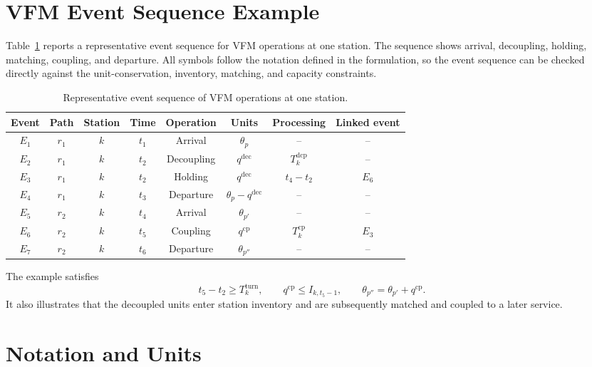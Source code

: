 \documentclass[11pt]{article}
\begin{document}
\section{VFM Event Sequence Example}
\label{App:VFMExample}

Table~\ref{AppTab:vfmEvent} reports a representative event sequence for VFM operations at one station. The sequence shows arrival, decoupling, holding, matching, coupling, and departure. All symbols follow the notation defined in the formulation, so the event sequence can be checked directly against the unit-conservation, inventory, matching, and capacity constraints.

\begin{table}[!htbp]
\centering
\small
\caption{Representative event sequence of VFM operations at one station.}
\label{AppTab:vfmEvent}
\begin{tabular}{cccccccc}
\toprule
\textbf{Event} & \textbf{Path} & \textbf{Station} & \textbf{Time} & \textbf{Operation} & \textbf{Units} & \textbf{Processing} & \textbf{Linked event} \\
\midrule
$E_1$ & $r_1$ & $k$ & $t_1$ & Arrival & $\theta_p$ & -- & -- \\
$E_2$ & $r_1$ & $k$ & $t_2$ & Decoupling & $q^{\mathrm{dec}}$ & $T_k^{\mathrm{dcp}}$ & -- \\
$E_3$ & $r_1$ & $k$ & $t_2$ & Holding & $q^{\mathrm{dec}}$ & $t_4-t_2$ & $E_6$ \\
$E_4$ & $r_1$ & $k$ & $t_3$ & Departure & $\theta_p-q^{\mathrm{dec}}$ & -- & -- \\
$E_5$ & $r_2$ & $k$ & $t_4$ & Arrival & $\theta_{p'}$ & -- & -- \\
$E_6$ & $r_2$ & $k$ & $t_5$ & Coupling & $q^{\mathrm{cp}}$ & $T_k^{\mathrm{cp}}$ & $E_3$ \\
$E_7$ & $r_2$ & $k$ & $t_6$ & Departure & $\theta_{p''}$ & -- & -- \\
\bottomrule
\end{tabular}
\end{table}

The example satisfies
\begin{equation}
t_5-t_2 \geq T_k^{\mathrm{turn}},
\qquad
q^{\mathrm{cp}} \leq I_{k,t_5-1},
\qquad
\theta_{p''}=\theta_{p'}+q^{\mathrm{cp}}.
\label{AppEq:eventTiming}
\end{equation}
It also illustrates that the decoupled units enter station inventory and are subsequently matched and coupled to a later service.

\FloatBarrier
\section{Notation and Units}
\label{App:Units}
\end{document}
